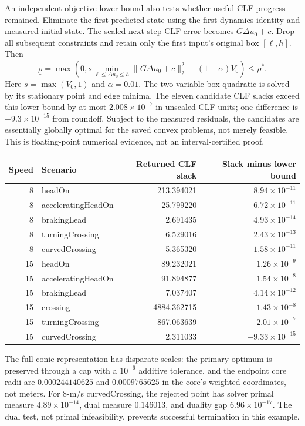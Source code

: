 \documentclass[11pt]{article}
\begin{document}
An independent objective lower bound also tests whether useful CLF progress
remained. Eliminate the first predicted state using the first dynamics
identity and measured initial state. The scaled next-step CLF error becomes
$G\Delta u_0+c$. Drop all subsequent constraints and retain only the first
input's original box $[\ell,h]$. Then
\[
 \underline\rho=\max\!\left(0,
 s\min_{\ell\le\Delta u_0\le h}\|G\Delta u_0+c\|_2^2
 -(1-\alpha)V_0\right)
 \le \rho^*.
\]
Here $s=\max(V_0,1)$ and $\alpha=0.01$. The two-variable box quadratic is
solved by its stationary point and edge minima. The eleven candidate CLF
slacks exceed this lower bound by at most $2.008\times10^{-7}$ in unscaled
CLF units; one difference is $-9.3\times10^{-15}$ from roundoff. Subject to
the measured residuals, the candidates are essentially globally optimal for
the saved convex problems, not merely feasible. This is floating-point
numerical evidence, not an interval-certified proof.

\begin{center}\small
\begin{tabular}{r l r r}
\toprule
Speed & Scenario & Returned CLF slack & Slack minus lower bound\\
\midrule
8 & headOn & 213.394021 & $8.94\times10^{-11}$\\
8 & acceleratingHeadOn & 25.799220 & $6.72\times10^{-11}$\\
8 & brakingLead & 2.691435 & $4.93\times10^{-14}$\\
8 & turningCrossing & 6.529016 & $2.43\times10^{-13}$\\
8 & curvedCrossing & 5.365320 & $1.58\times10^{-11}$\\
15 & headOn & 89.232021 & $1.26\times10^{-9}$\\
15 & acceleratingHeadOn & 91.894877 & $1.54\times10^{-8}$\\
15 & brakingLead & 7.037407 & $4.14\times10^{-12}$\\
15 & crossing & 4884.362715 & $1.43\times10^{-8}$\\
15 & turningCrossing & 867.063639 & $2.01\times10^{-7}$\\
15 & curvedCrossing & 2.311033 & $-9.33\times10^{-15}$\\
\bottomrule
\end{tabular}\end{center}

The full conic representation has disparate scales: the primary optimum is
preserved through a cap with a $10^{-6}$ additive tolerance, and the endpoint
core radii are $0.000244140625$ and $0.0009765625$ in the core's weighted
coordinates, not meters. For 8-m/s curvedCrossing, the rejected point has
solver primal measure $4.89\times10^{-14}$, dual measure $0.146013$, and
duality gap $6.96\times10^{-17}$. The dual test, not primal infeasibility,
prevents successful termination in this example.
\end{document}
